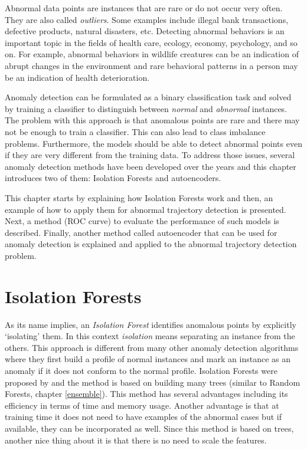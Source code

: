 \documentclass[
  11pt,
]{krantz}
\begin{document}
Abnormal data points are instances that are rare or do not occur very often. They are also called \emph{outliers}. Some examples include illegal bank transactions, defective products, natural disasters, etc. Detecting abnormal behaviors is an important topic in the fields of health care, ecology, economy, psychology, and so on. For example, abnormal behaviors in wildlife creatures can be an indication of abrupt changes in the environment and rare behavioral patterns in a person may be an indication of health deterioration.

Anomaly detection can be formulated as a binary classification task and solved by training a classifier to distinguish between \emph{normal} and \emph{abnormal} instances. The problem with this approach is that anomalous points are rare and there may not be enough to train a classifier. This can also lead to class imbalance problems. Furthermore, the models should be able to detect abnormal points even if they are very different from the training data. To address those issues, several anomaly detection methods have been developed over the years and this chapter introduces two of them: Isolation Forests and autoencoders.

This chapter starts by explaining how Isolation Forests work and then, an example of how to apply them for abnormal trajectory detection is presented. Next, a method (ROC curve) to evaluate the performance of such models is described. Finally, another method called autoencoder that can be used for anomaly detection is explained and applied to the abnormal trajectory detection problem.

\hypertarget{isolation-forests}{%
\section{Isolation Forests}\label{isolation-forests}}

As its name implies, an \emph{Isolation Forest} identifies anomalous points by explicitly `isolating' them. In this context \emph{isolation} means separating an instance from the others. This approach is different from many other anomaly detection algorithms where they first build a profile of normal instances and mark an instance as an anomaly if it does not conform to the normal profile. Isolation Forests were proposed by \citet{Liu2008isolation} and the method is based on building many trees (similar to Random Forests, chapter \ref{ensemble}). This method has several advantages including its efficiency in terms of time and memory usage. Another advantage is that at training time it does not need to have examples of the abnormal cases but if available, they can be incorporated as well. Since this method is based on trees, another nice thing about it is that there is no need to scale the features.
\end{document}
